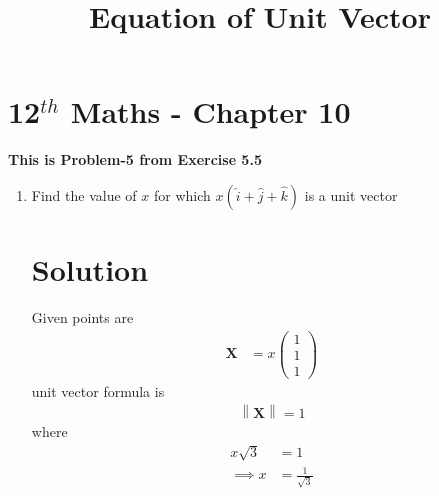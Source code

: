 \documentclass[12pt]{article}
\providecommand{\norm}[1]{\left\lVert#1\right\rVert}
\newcommand{\myvec}[1]{\ensuremath{\begin{pmatrix}#1\end{pmatrix}}}
\let\vec\mathbf
\begin{document}
\begin{center}
\title{\textbf{Equation  of Unit Vector}}
\date{\vspace{-5ex}} %
\maketitle
\end{center}
\setcounter{page}{1}
\section{12$^{th}$ Maths - Chapter 10}
\textbf{This is Problem-5 from Exercise 5.5}
\begin{enumerate}
\item Find the value of $x$ for which $x(\hat{i}+\hat{j}+\hat{k})$ is a unit vector
\section{Solution}
Given points are
\begin{align} 
\vec{X}&=x\myvec{1\\1\\1}
\end{align}
unit vector formula is
\begin{align}
\norm{\vec{X}}=1
\end{align}
where
\begin{align}
x\sqrt{3}&=1\\
\implies x&=\frac{1}{\sqrt{3}}
\end{align}   
\end{enumerate} 
\end{document}

